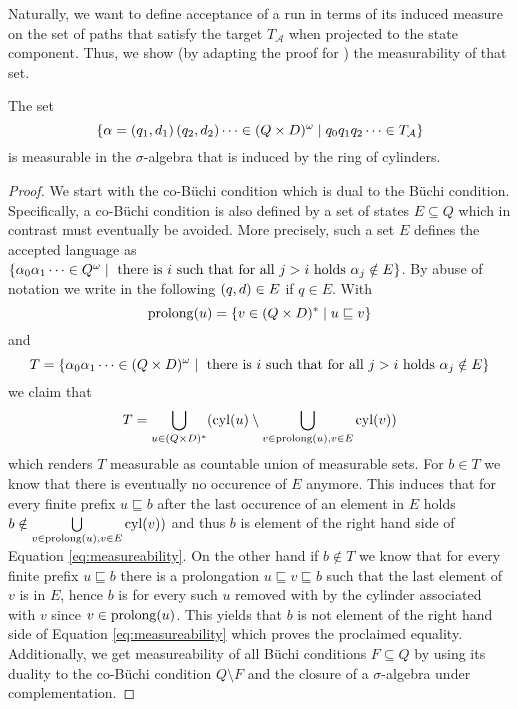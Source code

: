 Naturally, we want to define acceptance of a run in terms of its induced
measure on the set of paths that satisfy the target $T_{\mathcal{A}}$ when
projected to the state component. Thus, we show (by adapting the proof for
\cite[Proposition 6]{RandAutoInfTrees}) the measurability of that set.
\begin{lemma}[Measurability]
  The set
  \begin{equation*}
    \left\{\alpha = \left(q_{1},d_{1}\right)\left(q_{2},d_{2}\right)\dots\in
    (Q\times D)^{\omega}\mid q_{0}q_{1}q_{2}\dots\in T_{\mathcal{A}}\right\}
  \end{equation*} is measurable in the $\sigma$-algebra that is induced by the
  ring of cylinders.
  \label{lemma:measurabilityAcceptance}
\end{lemma}
\begin{proof}
  We start with the co-Büchi condition which is dual to the Büchi condition.
  Specifically, a co-Büchi condition is also defined by a set of
  states $E\subseteq Q$ which in contrast must eventually be avoided. More
  precisely, such a set $E$ defines the accepted language as
  $\left\{\alpha_{0}\alpha_{1}\dots\in Q^{\omega}\mid\text{ there is } i
  \text{ such that for all } j>i \text{ holds }\alpha_{j}\notin E\right\}$.
  By abuse of notation we write in the following
  $\left(q, d\right)\in E$ if $q\in E$. With
  \begin{equation*}
    \operatorname{prolong}(u) = \left\{v\in (Q\times D)^{*}\mid u\sqsubseteq v\right\}
  \end{equation*} and
  \begin{equation*}
    T = \left\{\alpha_{0}\alpha_{1}\dots\in (Q\times D)^{\omega}\mid\text{ there
    is } i \text{ such that for all } j>i \text{ holds }\alpha_{j}\notin E\right\}
  \end{equation*}
  we claim that
  \begin{equation} 
    T = \bigcup\limits_{u\in (Q\times D)^{*}}(
    \operatorname{cyl}(u)\setminus\bigcup\limits_{v\in\operatorname{prolong}(u),v\in E}\operatorname{cyl}(v))
    \label{eq:measureability}
  \end{equation}
  which renders $T$ measurable as countable union of measurable sets.
  For $b\in T$ we know that there is eventually no occurence of $E$
  anymore. This induces that for every finite prefix $u\sqsubseteq b$ after the
  last occurence of an element in $E$ holds
  $b\notin\bigcup\limits_{v\in\operatorname{prolong}(u),v\in E}\operatorname{cyl}(v))$ and thus $b$
  is element of the right hand side of Equation \ref{eq:measureability}. On the
  other hand if $b\notin T$ we know that for every finite prefix
  $u\sqsubseteq b$ there is a prolongation $u\sqsubseteq v\sqsubseteq b$ such
  that the last element of $v$ is in $E$, hence $b$ is for every such $u$
  removed with by the cylinder associated with $v$ since $v\in\operatorname{prolong}(u)$.
  This yields that $b$ is not element of the right hand side of Equation
  \ref{eq:measureability} which proves the proclaimed equality. Additionally,
  we get measureability of all Büchi conditions $F\subseteq Q$ by using its
  duality to the co-Büchi condition $Q\setminus F$ and the closure of a
  $\sigma$-algebra under complementation.


\end{proof}
